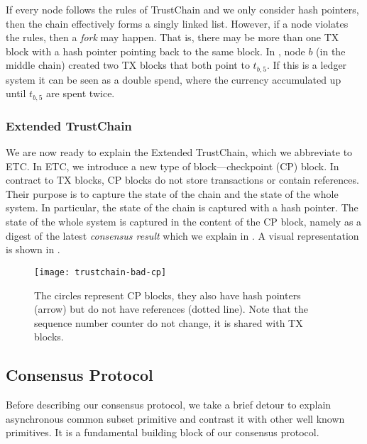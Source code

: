 If every node follows the rules of TrustChain and we only consider hash pointers,
then the chain effectively forms a singly linked list.
However, if a node violates the rules, then a \emph{fork} may happen.
That is, there may be more than one TX block with a hash pointer pointing back to the same block.
In , node $b$ (in the middle chain) created two TX blocks that both point to $t_{b, 5}$.
If this is a ledger system it can be seen as a double spend, where the currency accumulated up until $t_{b, 5}$ are spent twice.

\subsubsection*{Extended TrustChain}
We are now ready to explain the Extended TrustChain, which we abbreviate to ETC.
In ETC, we introduce a new type of block---checkpoint (CP) block.
In contract to TX blocks, CP blocks do not store transactions or contain references.
Their purpose is to capture the state of the chain and the state of the whole system.
In particular, the state of the chain is captured with a hash pointer.
The state of the whole system is captured in the content of the CP block,
namely as a digest of the latest \emph{consensus result} which we explain in .
A visual representation is shown in .

\begin{figure}
    \texttt{[image: trustchain-bad-cp]}
    \centering
    \caption{The circles represent CP blocks,
    they also have hash pointers (arrow) but do not have references (dotted line).
    Note that the sequence number counter do not change, it is shared with TX blocks.}
    \label{fig:trustchain-bad-cp}
\end{figure}

\subsection{Consensus Protocol}\label{sec:overview-cons}
Before describing our consensus protocol, we take a brief detour to explain asynchronous common subset primitive and contrast it with other well known primitives.
It is a fundamental building block of our consensus protocol.

